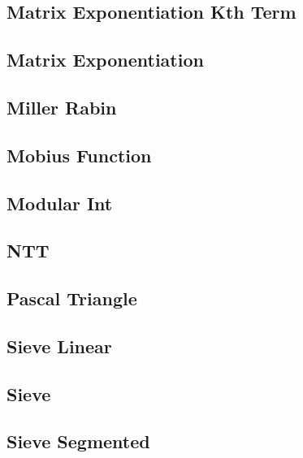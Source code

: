 \subsection{Matrix Exponentiation Kth Term}
\raggedbottom
\hrulefill
\subsection{Matrix Exponentiation}
\raggedbottom
\hrulefill
\subsection{Miller Rabin}
\raggedbottom
\hrulefill
\subsection{Mobius Function}
\raggedbottom
\hrulefill
\subsection{Modular Int}
\raggedbottom
\hrulefill
\subsection{NTT}
\raggedbottom
\hrulefill
\subsection{Pascal Triangle}
\raggedbottom
\hrulefill
\subsection{Sieve Linear}
\raggedbottom
\hrulefill
\subsection{Sieve}
\raggedbottom
\hrulefill
\subsection{Sieve Segmented}
\raggedbottom
\hrulefill

